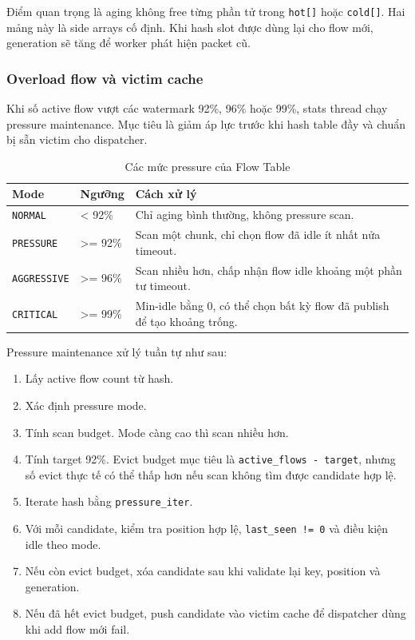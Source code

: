 \documentclass[12pt,a4paper]{report}
\DeclareRobustCommand{\code}[1]{{\small\texttt{#1}}}
\begin{document}
Điểm quan trọng là aging không free từng phần tử trong \code{hot[]} hoặc \code{cold[]}. Hai mảng này là side arrays cố định. Khi hash slot được dùng lại cho flow mới, generation sẽ tăng để worker phát hiện packet cũ.

\subsubsection{Overload flow và victim cache}

Khi số active flow vượt các watermark 92\%, 96\% hoặc 99\%, stats thread chạy pressure maintenance. Mục tiêu là giảm áp lực trước khi hash table đầy và chuẩn bị sẵn victim cho dispatcher.

\begin{table}[H]
\centering
\small
\caption{Các mức pressure của Flow Table}
\label{tab:pressure_modes}
\begin{tabularx}{\textwidth}{|L{3.8cm}|C{2.5cm}|Y|}
\hline
\textbf{Mode} & \textbf{Ngưỡng} & \textbf{Cách xử lý} \\
\hline
\code{NORMAL} & < 92\% & Chỉ aging bình thường, không pressure scan. \\
\hline
\code{PRESSURE} & >= 92\% & Scan một chunk, chỉ chọn flow đã idle ít nhất nửa timeout. \\
\hline
\code{AGGRESSIVE} & >= 96\% & Scan nhiều hơn, chấp nhận flow idle khoảng một phần tư timeout. \\
\hline
\code{CRITICAL} & >= 99\% & Min-idle bằng 0, có thể chọn bất kỳ flow đã publish để tạo khoảng trống. \\
\hline
\end{tabularx}
\end{table}

Pressure maintenance xử lý tuần tự như sau:

\begin{enumerate}
    \item Lấy active flow count từ hash.
    \item Xác định pressure mode.
    \item Tính scan budget. Mode càng cao thì scan nhiều hơn.
    \item Tính target 92\%. Evict budget mục tiêu là \code{active\_flows - target}, nhưng số evict thực tế có thể thấp hơn nếu scan không tìm được candidate hợp lệ.
    \item Iterate hash bằng \code{pressure\_iter}.
    \item Với mỗi candidate, kiểm tra position hợp lệ, \code{last\_seen != 0} và điều kiện idle theo mode.
    \item Nếu còn evict budget, xóa candidate sau khi validate lại key, position và generation.
    \item Nếu đã hết evict budget, push candidate vào victim cache để dispatcher dùng khi add flow mới fail.
\end{enumerate}
\end{document}
